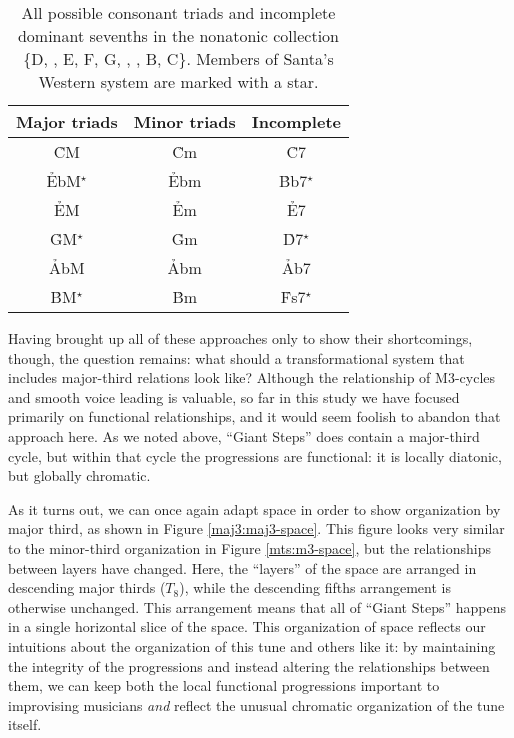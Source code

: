 \begin{table}[tbp]
  \centering
  \vspace{1em}
  \begin{tabular}{ccc}
    Major triads  & Minor triads & Incomplete \V \\
    \hline
    \rule[1em]{0ex}{1ex}%
    \h{CM}\;  & \h{Cm}    & \h{C7}\; \\
    \h{EbM}$^\star$ & \h{Ebm}   & \h{Bb7}$^\star$ \\
    \h{EM}\;  & \h{Em}    & \h{E7}\; \\
    \h{GM}$^\star$  & \h{Gm}    & \h{D7}$^\star$ \\
    \h{AbM}\; & \h{Abm}   & \h{Ab7}\; \\
    \h{BM}$^\star$  & \h{Bm}    & \h{Fs7}$^\star$ \\
  \end{tabular}
  \caption[All possible consonant triads and incomplete dominant sevenths in the
    nonatonic collection \{D, \Eflat, E, F\sharp, G, \Aflat, \Bflat, B,
    C\}.]{All possible consonant triads and incomplete dominant sevenths in the
    nonatonic collection \{D, \Eflat, E, F\sharp, G, \Aflat, \Bflat, B,
    C\}. Members of Santa's Western system are marked with a star.}
  \label{maj3:nonatonic-table}
\end{table}

Having brought up all of these approaches only to show their shortcomings,
though, the question remains: what should a transformational system that
includes major-third relations look like? Although the relationship of
M3-cycles and smooth voice leading is valuable, so far in this study we have
focused primarily on functional relationships, and it would seem foolish
to abandon that approach here. As we noted above, ``Giant Steps'' does contain
a major-third cycle, but within that cycle the progressions are functional: it
is locally diatonic, but globally chromatic.

As it turns out, we can once again adapt \tf space in order to show
organization by major third, as shown in Figure \ref{maj3:maj3-space}. This
figure looks very similar to the minor-third organization in Figure
\ref{mts:m3-space}, but the relationships between layers have
changed. Here, the ``layers'' of the space are arranged in
descending major thirds ($T_8$), while the descending fifths arrangement is
otherwise unchanged. This arrangement means that all of ``Giant Steps''
happens in a single horizontal slice of the space.
This organization of \tf space reflects our intuitions about the organization
of this tune and others like it: by maintaining the integrity of the \tfo
progressions and instead altering the relationships between them, we can keep
both the local functional progressions important to improvising musicians \emph{and}
reflect the unusual chromatic organization of the tune itself.

